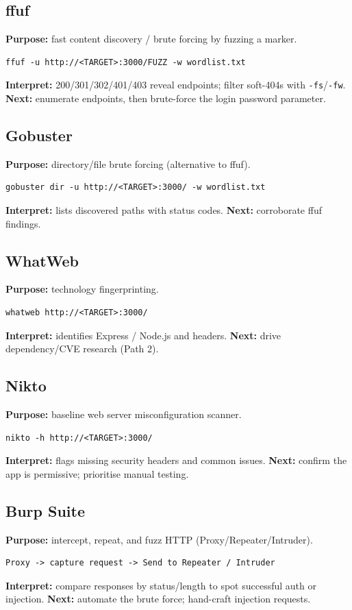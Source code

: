 \documentclass[11pt,a4paper]{article}
\begin{document}
\subsection{ffuf}
\textbf{Purpose:} fast content discovery / brute forcing by fuzzing a marker.
\begin{lstlisting}[style=bash]
ffuf -u http://<TARGET>:3000/FUZZ -w wordlist.txt
\end{lstlisting}
\textbf{Interpret:} 200/301/302/401/403 reveal endpoints; filter soft-404s with
\texttt{-fs}/\texttt{-fw}. \textbf{Next:} enumerate endpoints, then brute-force the
login password parameter.

\subsection{Gobuster}
\textbf{Purpose:} directory/file brute forcing (alternative to ffuf).
\begin{lstlisting}[style=bash]
gobuster dir -u http://<TARGET>:3000/ -w wordlist.txt
\end{lstlisting}
\textbf{Interpret:} lists discovered paths with status codes. \textbf{Next:}
corroborate ffuf findings.

\subsection{WhatWeb}
\textbf{Purpose:} technology fingerprinting.
\begin{lstlisting}[style=bash]
whatweb http://<TARGET>:3000/
\end{lstlisting}
\textbf{Interpret:} identifies Express / Node.js and headers. \textbf{Next:} drive
dependency/CVE research (Path 2).

\subsection{Nikto}
\textbf{Purpose:} baseline web server misconfiguration scanner.
\begin{lstlisting}[style=bash]
nikto -h http://<TARGET>:3000/
\end{lstlisting}
\textbf{Interpret:} flags missing security headers and common issues.
\textbf{Next:} confirm the app is permissive; prioritise manual testing.

\subsection{Burp Suite}
\textbf{Purpose:} intercept, repeat, and fuzz HTTP (Proxy/Repeater/Intruder).
\begin{lstlisting}[style=plain]
Proxy -> capture request -> Send to Repeater / Intruder
\end{lstlisting}
\textbf{Interpret:} compare responses by status/length to spot successful auth or
injection. \textbf{Next:} automate the brute force; hand-craft injection requests.
\end{document}
